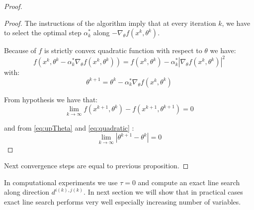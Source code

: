 \begin{proof}
\begin{proof}
The instructions of the algorithm imply that at every iteration $k$, we have to select the optimal step $\alpha_k^*$ along $-\nabla_{\theta}f(x^{k},\theta^{k})$.

Because of $f$ is strictly convex quadratic function with respect to $\theta$ we have:
\begin{equation}\label{eq:quadratic}
f(x^{k},\theta^k-\alpha^*_k\nabla_{\theta}f(x^{k},\theta^{k})) = f(x^{k},\theta^{k})-\alpha^*_k |\nabla_{\theta}f(x^{k},\theta^{k})|^2
\end{equation}
with:
\begin{equation}\label{eq:upTheta}
 \theta^{k+1}= \theta^{k}-\alpha^*_k\nabla_{\theta}f(x^{k},\theta^{k})
\end{equation}

From hypothesis we have that:
\begin{equation}
 \lim_{k \to \infty} f(x^{k+1},\theta^k)-f(x^{k+1},\theta^{k+1})=0
 \end{equation}

and from \ref{eq:upTheta} and \ref{eq:quadratic} :
\begin{equation}
  \lim_{k\to \infty} |\theta^{k+1} -\theta^k| = 0 
\end{equation}
\end{proof}
 
Next convergence steps are equal to previous proposition.
\end{proof}

\begin{oss}
In computational experiments we use $\tau = 0$ and compute an exact line search along direction $d^{i(k),j(k)}$. In next section we will show that in practical cases exact line search performs very well especially increasing number of variables.
\end{oss}


